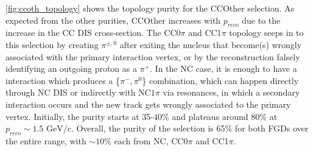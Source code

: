\autoref{fig:ccoth_topology} shows the topology purity for the CCOther selection. As expected from the other purities, CCOther increases with $p_{reco}$ due to the increase in the CC DIS cross-section. The CC0$\pi$ and CC1$\pi$ topology seeps in to this selection by creating $\pi^{\pm,0}$ after exiting the nucleus that become(s) wrongly associated with the primary interaction vertex, or by the reconstruction falsely identifying an outgoing proton as a $\pi^+$. In the NC case, it is enough to have a interaction which produces a \{$\pi^-, \pi^0$\} combination, which can happen directly through NC DIS or indirectly with NC$1\pi$ via resonances, in which a secondary interaction occurs and the new track gets wrongly associated to the primary vertex. Initially, the purity starts at 35-40\% and plateaus around 80\% at $p_{reco} \sim 1.5\text{ GeV/c}$. Overall, the purity of the selection is 65\% for both FGDs over the entire range, with $\sim10\%$ each from NC, CC0$\pi$ and CC1$\pi$.
